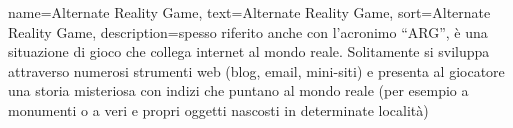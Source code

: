 {
    name=Alternate Reality Game, %
    text=Alternate Reality Game, %
    sort=Alternate Reality Game,
    description={spesso riferito anche con l’acronimo “ARG”, è una situazione di gioco che collega internet al mondo reale. Solitamente si sviluppa attraverso numerosi strumenti web (blog, email, mini-siti) e presenta al giocatore una storia misteriosa con indizi che puntano al mondo reale (per esempio a monumenti o a veri e propri oggetti nascosti in determinate località)}
}


